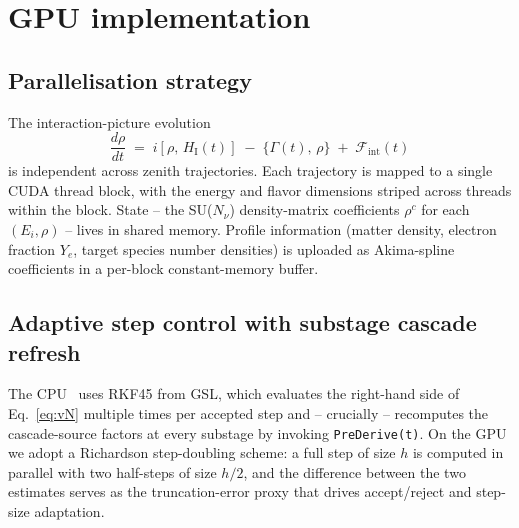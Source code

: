 \section{GPU implementation}
\label{sec:gpu_impl}

\subsection{Parallelisation strategy}

The interaction-picture evolution
\begin{equation}
  \frac{d\rho}{dt} \;=\; i[\rho,\, H_\mathrm{I}(t)]
                       \;-\; \{\Gamma(t),\, \rho\}
                       \;+\; \mathcal{F}_\mathrm{int}(t)
  \label{eq:vN}
\end{equation}
is independent across zenith trajectories. Each trajectory is mapped
to a single CUDA thread block, with the energy and flavor dimensions
striped across threads within the block. State -- the SU($N_\nu$)
density-matrix coefficients $\rho^c$ for each $(E_i, \rho)$ -- lives
in shared memory. Profile information (matter density, electron
fraction $Y_e$, target species number densities) is uploaded as
Akima-spline coefficients in a per-block constant-memory buffer.


\subsection{Adaptive step control with substage cascade refresh}

The CPU \nusquids\ uses RKF45 from \textsc{GSL}, which evaluates the
right-hand side of Eq.~\eqref{eq:vN} multiple times per accepted step
and -- crucially -- recomputes the cascade-source factors at every
substage by invoking \texttt{PreDerive(t)}. On the GPU we adopt a
Richardson step-doubling scheme: a full step of size $h$ is computed
in parallel with two half-steps of size $h/2$, and the difference
between the two estimates serves as the truncation-error proxy
that drives accept/reject and step-size adaptation.

